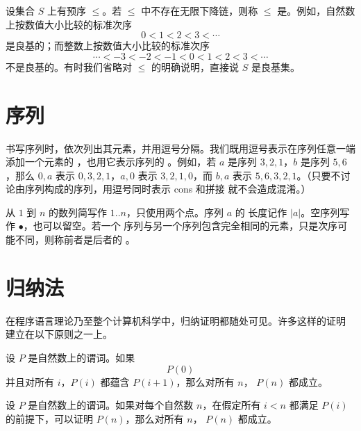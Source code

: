 \begin{definition}
\label{def:2.2.10}
设集合 \(S\) 上有预序 \(\leq\)。若 \(\leq\) 中不存在无限下降链，则称
\(\leq\) 是。例如，自然数上按数值大小比较的标准次序
\[
  0<1<2<3<\cdots
\]
是良基的；而整数上按数值大小比较的标准次序
\[
  \cdots<-3<-2<-1<0<1<2<3<\cdots
\]
不是良基的。有时我们省略对 \(\leq\) 的明确说明，直接说 \(S\) 是良基集。
\end{definition}

\section{序列}
\label{sec:2.3}

\begin{definition}
\label{def:2.3.1}
书写序列时，依次列出其元素，并用逗号分隔。我们既用逗号表示在序列任意一端
添加一个元素的 ，也用它表示序列的
。例如，若 \(a\) 是序列
\(3,2,1\)，\(b\) 是序列 \(5,6\)，那么 \(0,a\) 表示
\(0,3,2,1\)，\(a,0\) 表示 \(3,2,1,0\)，而 \(b,a\) 表示
\(5,6,3,2,1\)。（只要不讨论由序列构成的序列，用逗号同时表示 cons 和拼接
就不会造成混淆。）

从 \(1\) 到 \(n\) 的数列简写作 \(1..n\)，只使用两个点。序列 \(a\) 的
长度记作 \(\lvert a\rvert\)。空序列写作 \(\bullet\)，也可以留空。若一个
序列与另一个序列包含完全相同的元素，只是次序可能不同，则称前者是后者的
。
\end{definition}

\section{归纳法}
\label{sec:2.4}

在程序语言理论乃至整个计算机科学中，归纳证明都随处可见。许多这样的证明
建立在以下原则之一上。

\begin{axiom}[自然数上的普通归纳原理]
\label{ax:2.4.1}
设 \(P\) 是自然数上的谓词。如果
\[
  P(0)
\]
并且对所有 \(i\)，\(P(i)\) 都蕴含 \(P(i+1)\)，那么对所有 \(n\)，
\(P(n)\) 都成立。
\end{axiom}

\begin{axiom}[自然数上的完全归纳原理]
\label{ax:2.4.2}
设 \(P\) 是自然数上的谓词。如果对每个自然数 \(n\)，在假定所有
\(i<n\) 都满足 \(P(i)\) 的前提下，可以证明 \(P(n)\)，那么对所有 \(n\)，
\(P(n)\) 都成立。
\end{axiom}

